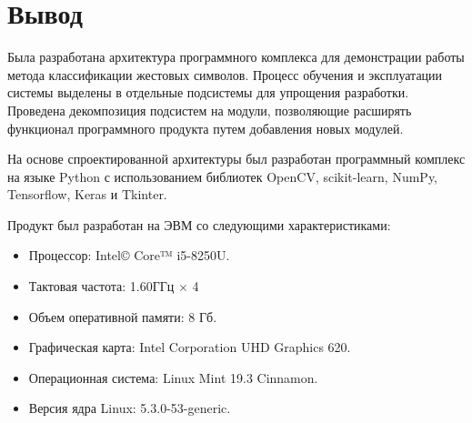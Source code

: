 \section{Вывод}

Была разработана архитектура программного комплекса для демонстрации работы метода классификации жестовых символов. Процесс обучения и эксплуатации системы выделены в отдельные подсистемы для упрощения разработки. Проведена декомпозиция подсистем на модули, позволяющие расширять функционал программного продукта путем добавления новых модулей.

На основе спроектированной архитектуры был разработан программный комплекс на языке Python с использованием библиотек OpenCV, scikit-learn, NumPy, Tensorflow, Keras и Tkinter.

Продукт был разработан на ЭВМ со следующими характеристиками:

\begin{itemize}
	\item Процессор: Intel© Core™ i5-8250U.
	\item Тактовая частота: 1.60ГГц $\times$ 4
	\item Объем оперативной памяти: 8 Гб.
	\item Графическая карта: Intel Corporation UHD Graphics 620.
	\item Операционная система: Linux Mint 19.3 Cinnamon.
	\item Версия ядра Linux: 5.3.0-53-generic.
\end{itemize}